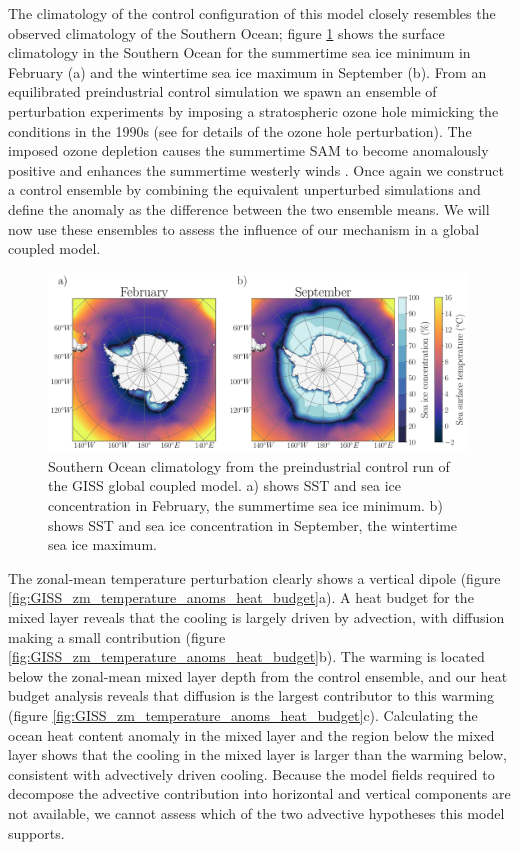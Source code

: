\documentclass{ametsocV5}
\begin{document}
The climatology of the control configuration of this model closely resembles the observed climatology of the Southern Ocean; figure \ref{fig:GISS_overview} shows the surface climatology in the Southern Ocean for the summertime sea ice minimum in February (a) and the wintertime sea ice maximum in September (b). From an equilibrated preindustrial control simulation we spawn an ensemble of perturbation experiments by imposing a stratospheric ozone hole mimicking the conditions in the 1990s (see \citet{Doddridge2019a} for details of the ozone hole perturbation). The imposed ozone depletion causes the summertime SAM to become anomalously positive and enhances the summertime westerly winds \citep{Polvani2011}. Once again we construct a control ensemble by combining the equivalent unperturbed simulations and define the anomaly as the difference between the two ensemble means. We will now use these ensembles to assess the influence of our mechanism in a global coupled model.






\begin{figure}[!ht]
    \begin{center}
        \includegraphics[width=0.99\textwidth]{figures/GISS_overview.pdf}
        \caption{Southern Ocean climatology from the preindustrial control run of the GISS global coupled model. a) shows SST and sea ice concentration in February, the summertime sea ice minimum. b) shows SST and sea ice concentration in September, the wintertime sea ice maximum.}
        \label{fig:GISS_overview}
    \end{center}
\end{figure}


The zonal-mean temperature perturbation clearly shows a vertical dipole (figure \ref{fig:GISS_zm_temperature_anoms_heat_budget}a). A heat budget for the mixed layer reveals that the cooling is largely driven by advection, with diffusion making a small contribution (figure \ref{fig:GISS_zm_temperature_anoms_heat_budget}b). The warming is located below the zonal-mean mixed layer depth from the control ensemble, and our heat budget analysis reveals that diffusion is the largest contributor to this warming (figure \ref{fig:GISS_zm_temperature_anoms_heat_budget}c). Calculating the ocean heat content anomaly in the mixed layer and the region below the mixed layer shows that the cooling in the mixed layer is larger than the warming below, consistent with advectively driven cooling. Because the model fields required to decompose the advective contribution into horizontal and vertical components are not available, we cannot assess which of the two advective hypotheses this model supports. 
\end{document}
